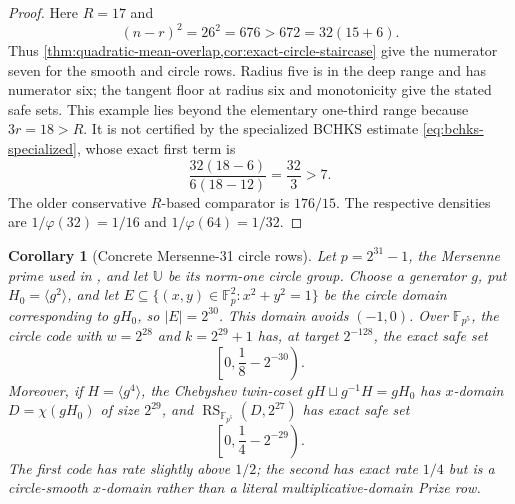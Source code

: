 \documentclass[11pt,a4paper]{amsart}
\numberwithin{equation}{section}
\newtheorem{corollary}[corollary]{Corollary}
\theoremstyle{remark}
\DeclareMathOperator{\RS}{RS}
\newcommand{\F}{\mathbb F}
\newcommand{\UU}{\mathbb U}
\newcommand{\abs}[1]{\lvert #1\rvert}
\begin{document}
\begin{proof}
Here \(R=17\) and
\[
 (n-r)^2=26^2=676>672=32(15+6).
\]
Thus \cref{thm:quadratic-mean-overlap,cor:exact-circle-staircase} give
the numerator seven for the smooth and circle rows.  Radius five is in
the deep range and has numerator six; the tangent floor at radius six and
monotonicity give the stated safe sets.  This example lies
beyond the elementary one-third range because \(3r=18>R\).  It is not
certified by the specialized BCHKS estimate
\eqref{eq:bchks-specialized}, whose exact first term is
\[
 \frac{32(18-6)}{6(18-12)}=\frac{32}{3}>7.
\]
The older conservative \(R\)-based comparator is \(176/15\).  The respective densities
are \(1/\varphi(32)=1/16\) and \(1/\varphi(64)=1/32\).
\end{proof}

\begin{corollary}[Concrete Mersenne-31 circle rows]
\label{cor:mersenne-circle-rows}
Let \(p=2^{31}-1\), the Mersenne prime used in \cite{HLP24}, and let
\(\UU\) be its norm-one circle group.
Choose a generator \(g\), put \(H_0=\langle g^2\rangle\), and let
\(E\subseteq\{(x,y)\in\F_p^2:x^2+y^2=1\}\) be the circle domain
corresponding to \(gH_0\), so \(\abs E=2^{30}\).  This domain avoids
\((-1,0)\).  Over \(\F_{p^5}\), the circle code with
\(w=2^{28}\) and \(k=2^{29}+1\) has, at target \(2^{-128}\),
the exact safe set
\[
\left[0,\frac18-2^{-30}\right).                 \tag{SC4}
\label{eq:mersenne-circle-safe}
\]
Moreover, if \(H=\langle g^4\rangle\), the Chebyshev twin-coset
\(gH\sqcup g^{-1}H=gH_0\) has \(x\)-domain
\(D=\chi(gH_0)\) of size \(2^{29}\), and
\(\RS_{\F_{p^5}}(D,2^{27})\) has exact safe set
\[
\left[0,\frac14-2^{-29}\right).                 \tag{SC5}
\label{eq:mersenne-x-safe}
\]
The first code has rate slightly above \(1/2\); the second has exact
rate \(1/4\) but is a circle-smooth \(x\)-domain rather than a literal
multiplicative-domain Prize row.
\end{corollary}
\end{document}
